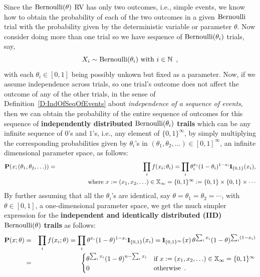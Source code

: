 Since the $\mbox{{\rm Bernoulli}}(\theta)$ RV has only two outcomes, i.e., simple events, we know how to obtain the probability of each of the two outcomes in a given $\mbox{{\rm Bernoulli}}$ trial with the probability given by the deterministic variable or parameter $\theta$. 
Now consider doing more than one trial so we have sequence of $\mbox{{\rm Bernoulli}}(\theta_i)$ trials, say,
\[
X_i \sim \mbox{{\rm Bernoulli}}(\theta_i) \text{ with } i \in \mathbb{N} \enspace ,
\] 
with each $\theta_i \in [0,1]$ being possibly unkown but fixed as a parameter. 
Now, if we assume independence across trials, so one trial's outcome does not affect the outcome of any of the other trials, in the sense of Definition~\ref{D:IndOfSeqOfEvents} 
about \emph{independence of a sequence of events}, then we can obtain the probability of the entire sequence of outcomes for this sequence of \textbf{independently distributed} $\mbox{{\rm Bernoulli}}(\theta_i)$ \textbf{trails} which can be any infinite sequence of $0$'s and $1$'s, i.e., any element of $\{0,1\}^{\infty}$, by simply multiplying the corresponding probabilities given by $\theta_i$'s in $(\theta_1,\theta_2,\ldots) \in [0,1]^{\infty}$, an infinite dimensional parameter space, as follows:
\begin{eqnarray}\label{Eq:probofindependentBernoullithetaiTrials}
\mathbf{P}(x; (\theta_1,\theta_2,\ldots)) &=& \prod_i f(x_i;\theta_i)= \prod_i \theta_i^{x_i} (1-\theta_i)^{1-x_i} {1}\mspace{-11 mu}{1}_{\{0,1\}}(x_i), \\
&~& \qquad \qquad \text{ where } x:= (x_1,x_2,\ldots) \in \mathbb{X}_{\infty} = \{0,1\}^{\infty} := \{0,1\} \times \{0,1\} \times \cdots \notag
\end{eqnarray}
By further assuming that all the $\theta_i$'s are identical, say $\theta = \theta_1 = \theta_2 = \cdots$, with $\theta \in [0,1]$, a one-dimensional parameter space, we get the much simpler expression for the \textbf{independent and identically distributed (IID)} $\mbox{{\rm Bernoulli}}(\theta)$ \textbf{trails} as follows:
\begin{eqnarray}\label{Eq:probofindependentIdenticalBernoullithetaTrials}
\mathbf{P}(x; \theta) &=& \prod_i f(x_i;\theta)= \prod_i \theta^{x_i} (1-\theta)^{1-x_i} {1}\mspace{-11 mu}{1}_{\{0,1\}}(x_i) =  {1}\mspace{-11 mu}{1}_{\{0,1\}^{\infty}}(x) \, \theta^{\sum_i x_i} (1-\theta)^{\sum_i(1-x_i)} \notag\\
&=&  
\begin{cases}
\theta^{\sum_i x_i} (1-\theta)^{n-\sum_i x_i} & \text{if $x:= (x_1,x_2,\ldots) \in \mathbb{X}_{\infty} = \{0,1\}^{\infty}$}\\ 
0 & \text{otherwise}\enspace .
\end{cases}
\end{eqnarray}

